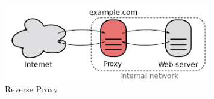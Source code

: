 	        \begin{figure}[H]  			
	        	\includegraphics[width=0.8\textwidth]{Images/reverseproxy.png}
	        	\centering
	        	\linebreak
	        	\caption{Reverse Proxy\cite{reverseproxy}}
	        \end{figure}
          
            
            
            
            
            
		